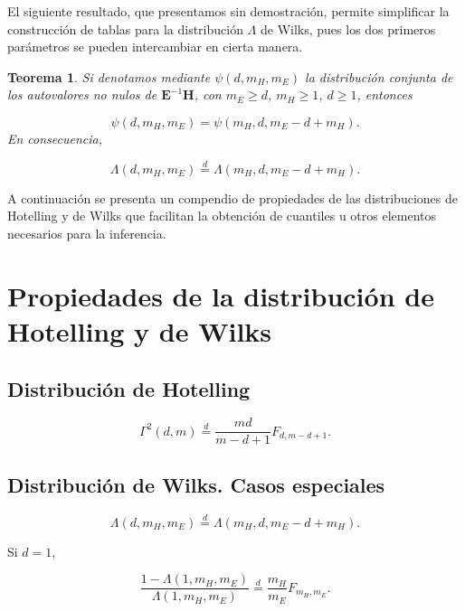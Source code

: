 \documentclass[
  a4paper,
  oneside]{scrbook}
\newtheorem{theorem}{Teorema}[chapter]
\theoremstyle{definition}
\theoremstyle{definition}
\theoremstyle{definition}
\theoremstyle{definition}
\theoremstyle{remark}
\begin{document}
El siguiente resultado, que presentamos sin demostración, permite
simplificar la construcción de tablas para la distribución \(\Lambda\) de
Wilks, pues los dos primeros parámetros se pueden intercambiar en cierta
manera.

\begin{theorem}
\protect\hypertarget{thm:unnamed-chunk-112}{}\label{thm:unnamed-chunk-112}Si denotamos mediante \(\psi(d,m_H,m_E)\) la distribución conjunta de los
autovalores no nulos de \(\bm{E}^{-1}\bm{H}\), con \(m_E\geq d\), \(m_H\geq 1\), \(d\geq 1\), entonces

\[\psi(d,m_H,m_E)=\psi(m_H,d,m_E-d+m_H).\] En consecuencia,

\[\Lambda(d,m_H,m_E)\stackrel{d}{=}\Lambda(m_H,d,m_E-d+m_H).\]
\end{theorem}

A continuación se presenta un compendio de propiedades de las
distribuciones de Hotelling y de Wilks que facilitan la obtención de
cuantiles u otros elementos necesarios para la inferencia.

\section*{Propiedades de la distribución de Hotelling y de Wilks}\label{apuxe9ndice-propiedades-de-la-distribuciuxf3n-de-hotelling-y-de-wilks}

\subsection*{Distribución de Hotelling}\label{distribuciuxf3n-de-hotelling}

\[\Gamma^2(d,m)\stackrel{d}{=}\frac{md}{m-d+1}F_{d,m-d+1}.\]

\subsection*{Distribución de Wilks. Casos especiales}\label{distribuciuxf3n-de-wilks.-casos-especiales}

\[\Lambda(d,m_H,m_E)\stackrel{d}{=} \Lambda(m_H,d,m_E-d+m_H).\]

Si \(d=1\),

\[\frac{1-\Lambda(1,m_H,m_E)}{\Lambda(1,m_H,m_E)}\stackrel{d}{=} \frac{m_H}{m_E} F_{m_H,m_E}.\]
\end{document}
